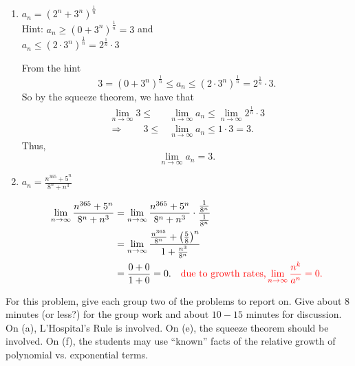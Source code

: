 \documentclass[handout]{ximera}
\begin{document}
\begin{problem}
\begin{enumerate}
	\item  $a_n = (2^n + 3^n)^{\frac{1}{n}}$  \\
	Hint:  $a_n \geq (0+3^n)^{\frac{1}{n}} = 3$ and \\ $a_n \leq (2 \cdot 3^n)^{\frac{1}{n}} = 2^{\frac{1}{n}} \cdot 3$

	\begin{freeResponse}
	From the hint
		\[
		3 = (0+3^n)^\frac{1}{n}  \leq a_n \leq (2 \cdot 3^n)^\frac{1}{n} = 2^\frac{1}{n} \cdot 3.
		\]
	So by the squeeze theorem, we have that
		\begin{align*}
		\lim_{n \to \infty} 3 \leq &\lim_{n \to \infty} a_n \leq \lim_{n \to \infty} 2^\frac{1}{n} \cdot 3  \\
		\Longrightarrow 	\qquad	3 \leq &\lim_{n \to \infty} a_n \leq 1 \cdot 3 = 3.
		\end{align*}
	Thus,
		\[
		\lim_{n \to \infty} a_n = 3.
		\]
	\end{freeResponse}
	
	
	
	\item  $a_n = \frac{n^{365} + 5^n}{8^n + n^3}$
	\begin{freeResponse}
		\begin{align*}
		\lim_{n \to \infty} \frac{n^{365} + 5^n}{8^n + n^3}
		&= \lim_{n \to \infty} \frac{n^{365} + 5^n}{8^n + n^3} \cdot \frac{\frac{1}{8^n}}{\frac{1}{8^n}}  \\
		&=  \lim_{n \to \infty} \frac{\frac{n^{365}}{8^n} + \left( \frac{5}{8} \right)^n}{1 + \frac{n^3}{8^n}}  \\
		&= \frac{0+0}{1+0} = 0.		\quad	{\color{red}\text{due to growth rates,} \lim_{n \to \infty} \frac{n^k}{a^n} = 0.}
		\end{align*}
	\end{freeResponse}
	
	


	\end{enumerate}
	
\end{problem}

\begin{instructorNotes}
For this problem, give each group two of the problems to report on.  
Give about $8$ minutes (or less?) for the group work and about $10-15$ minutes for discussion.  
On (a), L'Hospital's Rule is involved.  
On (e), the squeeze theorem should be involved.  
On (f), the students may use ``known'' facts of the relative growth of polynomial vs. exponential terms.
\end{instructorNotes}
\end{document}
